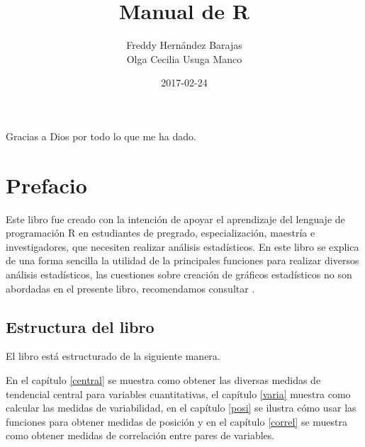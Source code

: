\documentclass[10pt,]{krantz}
\title{Manual de R}
\author{Freddy Hernández Barajas\\
Olga Cecilia Usuga Manco}
\date{2017-02-24}
\let\proglang=\textsf
\begin{document}
\maketitle


\thispagestyle{empty}

\begin{center}

Gracias a Dios por todo lo que me ha dado.

\end{center}

\setlength{\abovedisplayskip}{-5pt}
\setlength{\abovedisplayshortskip}{-5pt}

{
\hypersetup{linkcolor=black}
\setcounter{tocdepth}{2}
\tableofcontents
}
\listoftables
\listoffigures
\chapter*{Prefacio}\label{prefacio}


Este libro fue creado con la intención de apoyar el aprendizaje del
lenguaje de programación \proglang{R} en estudiantes de pregrado,
especialización, maestría e investigadores, que necesiten realizar
análisis estadísticos. En este libro se explica de una forma sencilla la
utilidad de la principales funciones para realizar diversos análisis
estadísticos, las cuestiones sobre creación de gráficos estadísticos no
son abordadas en el presente libro, recomendamos consultar
\citet{correa_hernandez}.

\section*{Estructura del libro}\label{estructura-del-libro}


El libro está estructurado de la siguiente manera.

En el capítulo \ref{central} se muestra como obtener las diversas
medidas de tendencial central para variables cuantitativas, el capítulo
\ref{varia} muestra como calcular las medidas de variabilidad, en el
capítulo \ref{posi} se ilustra cómo usar las funciones para obtener
medidas de posición y en el capítulo \ref{correl} se muestra como
obtener medidas de correlación entre pares de variables.
\end{document}
